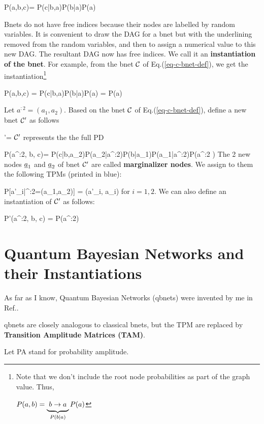 \beq
P(a,b,c)=
P(c|b,a)P(b|a)P(a)
\eeq

Bnets 
do not have free
indices
because 
their nodes are labelled by random
variables. It is convenient
to draw the DAG for a 
bnet but with the
underlining
removed from the random variables,
and then to
assign a numerical value to this new DAG.
The resultant DAG now
has free indices. We call it an
{\bf instantiation of the 
bnet}.
For example, from the
bnet ${\cal C}$ 
of Eq.(\ref{eq-c-bnet-def}),
we get the
instantiation\footnote{
Note that we don't
include the root node
probabilities as part of 
the graph value. Thus,
 
$P(a,b) =
\underbrace{\xymatrix{ b\rarrow a}}_{P(b|a)}
P(a)$}


\beq
P(a,b,c)
=
P(c|b,a)P(b|a)P(a)
=
\bcen
{}
\ecen
P(a)
\eeq

Let $a^{:2} = (a_1, a_2)$.
Based on
the bnet ${\cal C}$ of
Eq.(\ref{eq-c-bnet-def}),
define a new bnet ${\cal C}'$
as follows

\beq
\calc'=
\bcen
{}
\ecen
\eeq
${\cal C}'$ represents the 
the full PD 

\beq
P(a^{:2}, b, c)=
P(c|b,a_2)P(a_2|a^{:2})P(b|a_1)P(a_1|a^{:2})P(a^{:2}
)
\eeq
The 2 new nodes
$\rva_1$ and $\rva_2$
of bnet ${\cal C}'$
are called 
{\bf marginalizer nodes}.
We assign to them
the following TPMs (printed in blue):

\beq \color{blue}
P[a'_i|\rva^{:2}=(a_1,a_2)] = \delta(a'_i, a_i)
\eeq
for $i=1,2$.
We can also
define an instantiation of ${\cal C}'$ as follows:

\beq
P'(a^{:2}, b, c)
=
\bcen
{}
\ecen
P(a^{:2})
\eeq




\section{Quantum Bayesian Networks and
their Instantiations}

As far as I know,
Quantum Bayesian Networks
(qbnets) were invented by me in Ref.\cite{tucci-qbnets}.

qbnets are closely
analogous to classical
bnets, but the TPM
are replaced by {\bf Transition Amplitude 
Matrices (TAM)}.

Let PA stand for probability amplitude. 


